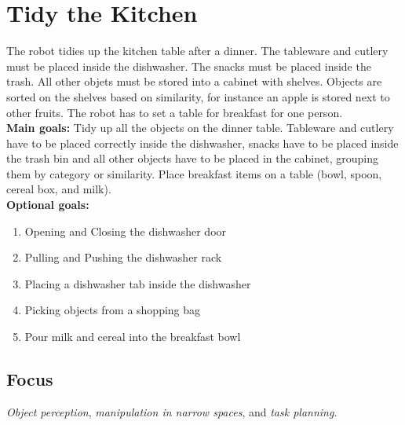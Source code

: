 \section{Tidy the Kitchen}
\label{test:tidy-the-kitchen}
The robot tidies up the kitchen table after a dinner. 
The tableware and cutlery must be placed inside the dishwasher. 
The snacks must be placed inside the trash.
All other objets must be stored into a cabinet with shelves. Objects are sorted on the shelves based on similarity, for instance an apple is stored next to other fruits. 
The robot has to set a table for breakfast for one person.\\

\noindent \textbf{Main goals:}  
Tidy up all the objects on the dinner table. Tableware and cutlery have to be placed correctly inside the dishwasher, snacks have to be placed inside the trash bin and all other objects have to be placed in the cabinet, grouping them by category or similarity.
Place breakfast items on a table (bowl, spoon, cereal box, and milk). \\

\noindent \textbf{Optional goals:}
\begin{enumerate}[nosep]
	\item Opening and Closing the dishwasher door
	\item Pulling and Pushing the dishwasher rack
	\item Placing a dishwasher tab inside the dishwasher
	\item Picking objects from a shopping bag
	\item Pour milk and cereal into the breakfast bowl
\end{enumerate}

\subsection*{Focus}
\emph{Object perception}, \emph{manipulation in narrow spaces}, and \emph{task planning}.

